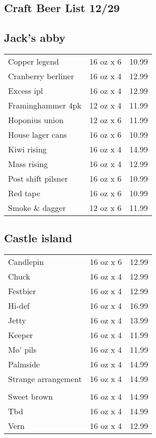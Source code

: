 \documentclass{article}%
\begin{document}
%
\pagestyle{empty}%
\normalsize%
%
\setlength{\columnseprule}{0.5pt}%
\setlength{\columnsep}{1cm}%
\renewcommand{\familydefault}{\sfdefault}%
\sffamily%
\begin{multicols}{3}%
\section*{\selectfont Craft Beer List 12/29}%

%
\subsection*{Jack's abby}%
\begin{tabular}{l c r}%
Copper legend&16 oz x 6&10.99\\%
Cranberry berliner&16 oz x 4&12.99\\%
Excess ipl&16 oz x 4&12.99\\%
Framinghammer 4pk&12 oz x 4&11.99\\%
Hoponius union&12 oz x 6&11.99\\%
House lager cans&16 oz x 6&10.99\\%
Kiwi rising&16 oz x 4&14.99\\%
Mass rising&16 oz x 4&12.99\\%
Post shift pilsner&16 oz x 6&10.99\\%
Red tape&16 oz x 6&10.99\\%
Smoke \& dagger&12 oz x 6&11.99\\%
\end{tabular}

%
\subsection*{Castle island}%
\begin{tabular}{l c r}%
Candlepin&16 oz x 6&12.99\\%
Chuck&16 oz x 4&12.99\\%
Festbier&16 oz x 4&12.99\\%
Hi{-}def&16 oz x 4&16.99\\%
Jetty&16 oz x 4&13.99\\%
Keeper&16 oz x 4&11.99\\%
Mo' pils&16 oz x 4&11.99\\%
Palmside&16 oz x 4&14.99\\%
\multirow{1}{15ex}{Strange arrangement}&16 oz x 4&14.99\\%
&&\\%
Sweet brown&16 oz x 4&14.99\\%
Tbd&16 oz x 4&14.99\\%
Vern&16 oz x 4&12.99\\%
\end{tabular}


\end{multicols}
\end{document}

